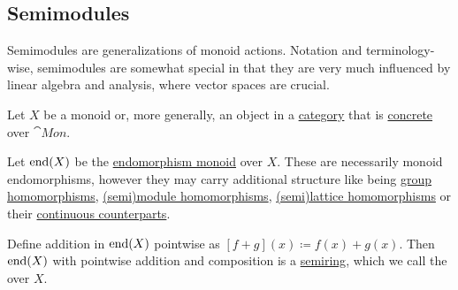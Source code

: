 \subsection{Semimodules}\label{subsec:semimodules}

Semimodules are generalizations of monoid actions. Notation and terminology-wise, semimodules are somewhat special in that they are very much influenced by linear algebra and analysis, where vector spaces are crucial.

\begin{definition}\label{def:endomorphism_semiring}
  Let \( X \) be a monoid or, more generally, an object in a \hyperref[def:category]{category} that is \hyperref[def:concrete_category]{concrete} over \hyperref[def:monoid/category]{\( \cat{Mon} \)}.

  Let \( \operatorname{end}(X) \) be the \hyperref[def:endomorphism_monoid]{endomorphism monoid} over \( X \). These are necessarily monoid endomorphisms, however they may carry additional structure like being \hyperref[def:group/homomorphism]{group homomorphisms}, \hyperref[def:semimodule/homomorphism]{(semi)module homomorphisms}, \hyperref[def:semilattice/homomorphism]{(semi)lattice homomorphisms} or their \hyperref[rem:topological_first_order_structures]{continuous counterparts}.

  Define addition in \( \operatorname{end}(X) \) pointwise as \( [f + g](x) \coloneqq f(x) + g(x) \). Then \( \operatorname{end}(X) \) with pointwise addition and composition is a \hyperref[def:semiring]{semiring}, which we call the  over \( X \).
\end{definition}

